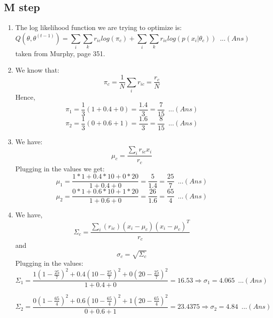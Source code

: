\documentclass[letterpaper]{article}
\begin{document}
	\subsection*{M step}
	\begin{enumerate}
		\item The log likelihood function we are trying to optimize is:
		\begin{equation}
			Q(\theta, \theta^{(t-1)}) = \sum_{i}{\sum_{k}{r_{ic}log(\pi_{c})}}  + \sum_{i}{\sum_{k}{r_{ic}log(p(x_i|\theta_c))}} \,\,\, ...(Ans)
		\end{equation}
		taken from Murphy, page 351.
		\item
		We know that:
		\begin{equation}
			\pi_c = \frac{1}{N}\sum_i{r_{ic}} = \frac{r_c}{N}
		\end{equation}
		Hence,
		\begin{equation}
			\pi_1 = \frac{1}{3}(1+0.4+0) = \frac{1.4}{3} = \frac{7}{15} \,\,\, ...(Ans)
		\end{equation}
		\begin{equation}
			\pi_2 = \frac{1}{3}(0+0.6+1) = \frac{1.6}{3} = \frac{8}{15} \,\,\, ...(Ans)
		\end{equation}
		\item
		We have: 
		\begin{equation}
			\mu_c = \frac{\sum_i{r_{ic}x_i}}{r_c}
		\end{equation}
		Plugging in the values we get:
		\begin{equation}
			\mu_1 = \frac{1*1 + 0.4*10 + 0*20}{1 + 0.4 + 0} = \frac{5}{1.4} = \frac{25}{7} \,\,\,...(Ans)
		\end{equation}
		\begin{equation}
			\mu_2 = \frac{0*1 + 0.6*10 + 1*20}{1 + 0.6 + 0} = \frac{26}{1.6} = \frac{65}{4} \,\,\,...(Ans)
		\end{equation}
		\item
		We have,
		\begin{equation}
			\Sigma_c = \frac{\sum_i{(r_{ic})(x_i-\mu_c)(x_i - \mu_c)^T}}{r_c}
		\end{equation}
		and
		\begin{equation}
			\sigma_c = \sqrt{\Sigma_c}
		\end{equation}
		Plugging in the values:
		\begin{equation}
			\Sigma_1 = \frac{1(1-\frac{25}{7})^2 + 0.4(10-\frac{25}{7})^2 + 0(20-\frac{25}{7})^2}{1 + 0.4 + 0} = 16.53 \Rightarrow \sigma_1 = 4.065\,\,\,...(Ans)
		\end{equation}
		
		\begin{equation}
			\Sigma_2 = \frac{0(1-\frac{65}{4})^2+0.6(10-\frac{65}{4})^2+ 1(20-\frac{65}{4})^2}{0 + 0.6 + 1} = 23.4375 \Rightarrow \sigma_2 = 4.84 \,\,\,...(Ans)
		\end{equation}
		
	\end{enumerate}
\end{document}
